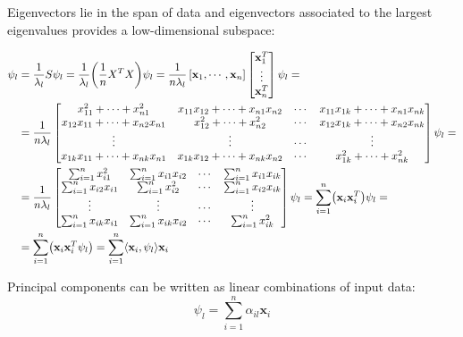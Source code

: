 \documentclass[12pt, letterpaper]{article}
\theoremstyle{definition}
\newcommand{\x}{\mathbf{x}}
\DeclarePairedDelimiter\autobracket{(}{)}
\newcommand{\br}[1]{\autobracket*{#1}}
\begin{document}
Eigenvectors lie in the span of data and eigenvectors associated to the largest eigenvalues provides a low-dimensional subspace:

\begin{equation}
\begin{aligned}
\psi_l  &= \frac{1}{\lambda_l} S \psi_l = \frac{1}{\lambda_l} \br{\frac{1}{n}X^TX} \psi_l = \frac{1}{n\lambda_l} \left[\x_1, \cdots, \x_n \right] \begin{bmatrix} \x_1^T \\ \vdots\\ \x_n^T\end{bmatrix} \psi_l = \\
&= \frac{1}{n\lambda_l} \begin{bmatrix}
x_{11}^2 +\cdots  +x_{n1}^2             & x_{11}x_{12}+\cdots +x_{n1}x_{n2}& \cdots &x_{11}x_{1k}+\cdots +x_{n1}x_{nk}\\
x_{12} x_{11} +\cdots + x_{n2}x_{n1} & x_{12}^2+\cdots +x_{n2}^2          &\cdots &x_{12}x_{1k}+\cdots +x_{n2}x_{nk}\\
\vdots&\vdots&\cdots &\vdots \\
x_{1k} x_{11} +\cdots + x_{nk}x_{n1} & x_{1k}x_{12} +\cdots +x_{nk}x_{n2}          &\cdots &x_{1k}^2+\cdots +x_{nk}^2
\end{bmatrix}\psi_l =\\
&= \frac{1}{n\lambda_l} \begin{bmatrix}
\sum_{i=1}^n x_{i1}^2     &\sum_{i=1}^n x_{i1}x_{i2}& \cdots &\sum_{i=1}^n x_{i1}x_{ik}\\
\sum_{i=1}^nx_{i2} x_{i1} & \sum_{i=1}^n x_{i2}^2          &\cdots &\sum_{i=1}^n x_{i2}x_{ik}\\
\vdots&\vdots&\cdots &\vdots \\
\sum_{i=1}^n x_{ik} x_{i1}  & \sum_{i=1}^n x_{ik}x_{i2}         &\cdots &\sum_{i=1}^n x_{ik}^2
\end{bmatrix}\psi_l = \sum_{i=1}^n \br{\x_i \x_i^T}\psi_l=\\
&= \sum_{i=1}^n \br{\x_i \x_i^T\psi_l} = \sum_{i=1}^n \langle \x_i,\psi_l\rangle\x_i
\end{aligned}
\end{equation}

Principal components can be written as linear combinations of input data:
\begin{equation}
\label{PCALinComb}
\psi_l = \sum_{i=1}^n \alpha_{il} \x_i
\end{equation}
\end{document}
